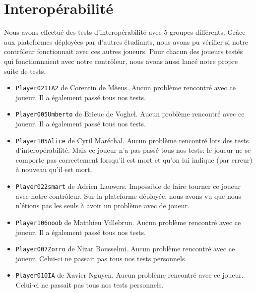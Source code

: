 \documentclass{article}
\begin{document}
\section{Interopérabilité}
Nous avons effectué des tests d'interopérabilité avec 5 groupes différents. Grâce aux plateformes déployées par d'autres étudiants, nous avons pu vérifier si notre contrôleur fonctionnait avec ces autres joueurs. Pour chacun des joueurs testés qui fonctionnaient avec notre contrôleur, nous avons aussi lancé notre propre suite de tests.
\begin{itemize}
	\item \texttt{Player021IA2} de Corentin de Mêeus. Aucun problème rencontré avec ce joueur. Il a également passé tous nos tests.
	\item \texttt{Player005Umberto} de Brieuc de Voghel. Aucun problème rencontré avec ce joueur. Il a également passé tous nos tests.
	\item \texttt{Player105Alice} de Cyril Maréchal. Aucun problème rencontré lors des tests d'interopérabilité. Mais ce joueur n'a pas passé tous nos tests: le joueur ne se comporte pas correctement lorsqu'il est mort et qu'on lui indique (par erreur) à nouveau qu'il est mort.
	\item \texttt{Player022smart} de Adrien Lauwers. Impossible de faire tourner ce joueur avec notre contrôleur. Sur la plateforme déployée, nous avons vu que nous n'étions pas les seuls à avoir un problème avec de joueur.
	\item \texttt{Player106noob} de Matthieu Villebrun. Aucun problème rencontré avec ce joueur. Il a également passé tous nos tests.
	\item \texttt{Player007Zorro} de Nizar Bousselmi. Aucun problème rencontré avec ce joueur. Celui-ci ne passait pas tous nos tests personnels.
	\item \texttt{Player010IA} de Xavier Nguyen. Aucun problème rencontré avec ce joueur. Celui-ci ne passait pas tous nos tests personnels.
\end{itemize}
\end{document}

